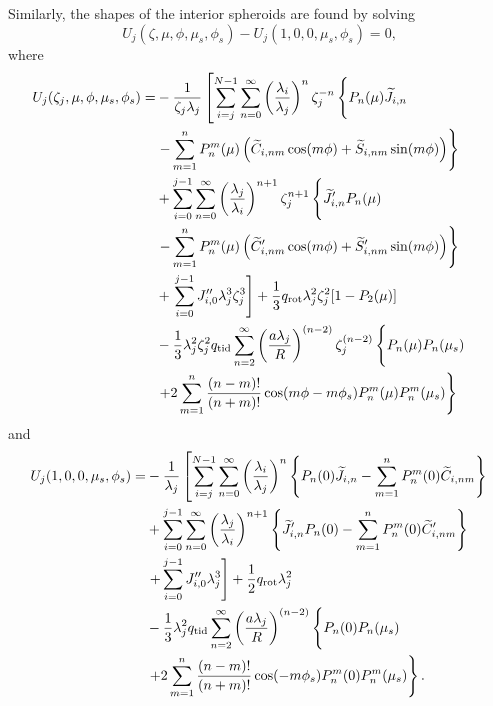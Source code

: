 %
Similarly, the shapes of the interior spheroids are found by solving
%
\begin{equation} U_j(\zeta,\mu,\phi,\mu_s,\phi_s) -  U_j(1,0,0,\mu_s,\phi_s) = 0,
    \label{eq:equipotential_interior} \end{equation}
%
where
%
\begin{equation} \label{eq:Uj} \begin{aligned} U_j(\zeta_j,\mu,\phi,\mu_s,\phi_s) =&
        -\frac{1}{\zeta_j \lambda_j} \left[ \sum^{N-1}_{i=j} \sum^\infty_{n=0} \left(
            \frac{\lambda_i}{\lambda_j} \right)^n \zeta_j^{-n} \left\{ P_{n}(\mu)
            \widetilde{J}_{i,n} \phantom{\sum_a^b} \right. \right. \\ & \left. -
            \sum_{m=1}^{n} P_n^m(\mu) \left( \widetilde{C}_{i,nm}\cos(m\phi) +
            \widetilde{S}_{i,nm}\sin(m\phi) \right) \right\}  \\ &+ \sum^{j-1}_{i=0}
            \sum^\infty_{n=0} \left( \frac{\lambda_j}{\lambda_i} \right)^{n+1}
            \zeta_j^{n+1} \left\{ \widetilde{J}'_{i,n} P_n(\mu) \phantom{ \sum_1^m} \right.
            \\ & \left. - \sum_{m=1}^{n} P_n^m(\mu) \left( \widetilde{C}'_{i,nm}\cos(m\phi)
        + \widetilde{S}'_{i,nm}\sin(m\phi) \right) \right\} \\ &+ \left. \sum^{j-1}_{i=0}
    J''_{i,0} \lambda_j^3 \zeta_j^3 \right] + \frac{1}{3} q_{\rm rot} \lambda_j^2
    \zeta_j^2 [1 - P_2(\mu)] \\ &-\frac{1}{3} \lambda_j^2 \zeta_j^{2} q_{\rm tid}
    \sum_{n=2}^\infty \left(\frac{a\lambda_j}{R}\right)^{(n-2)} \zeta_j^{(n-2)}
    \left\{ P_n(\mu) P_n(\mu_s) \phantom{\sum_a^b} \right. \\ & \left. + 2
    \sum_{m=1}^{n} \frac{(n-m)!}{(n+m)!} \cos(m\phi - m\phi_s) P_n^m(\mu)
P_n^m(\mu_s) \right\} \end{aligned} \end{equation}
%
and
%
\begin{equation} \begin{aligned} U_{j}(1,0,0,\mu_s,\phi_s) =& -
        \frac{1}{\lambda_j}\left[ \sum^{N-1}_{i=j} \sum^\infty_{n=0} \left(
            \frac{\lambda_i}{\lambda_j} \right)^n   \left\{ P_{n}(0) \widetilde{J}_{i,n} -
            \sum_{m=1}^{n} P_n^m(0) \widetilde{C}_{i,nm}\right\} \right.\\ & +
        \sum^{j-1}_{i=0} \sum^\infty_{n=0} \left( \frac{\lambda_j}{\lambda_i}
    \right)^{n+1} \left\{ \widetilde{J}'_{i,n} P_n(0) - \sum_{m=1}^{n} P_n^m(0)
\widetilde{C}'_{i,nm} \right\} \\ & \left. + \sum^{j-1}_{i=0} J''_{i,0} \lambda_j^3 \right]
+\frac{1}{2} q_{\rm rot} \lambda_j^2 \\ & - \frac{1}{3} \lambda_j^2 q_{\rm tid}
\sum_{n=2}^\infty \left(\frac{a\lambda_j}{R}\right)^{(n-2)} \left\{  P_n(0)
    P_n(\mu_s) \phantom{\sum_1^1} \right. \\ & \left. + 2 \sum_{m=1}^{n}
    \frac{(n-m)!}{(n+m)!} \cos(- m\phi_s) P_n^m(0) P_n^m(\mu_s) \right\}. \\
\end{aligned} \label{eq:interior_subsatellite} \end{equation}
